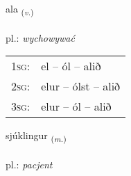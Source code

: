\documentclass[frontgrid, backgrid]{flacards}\usepackage[]{graphicx}\usepackage[]{xcolor}
\begin{document}
\renewcommand{\flhead}{\vskip5pt \fboxsep=0pt {\small\bfseries\footnotesize Sagnorð | Verb}}
\renewcommand{\fcfoot}{\vskip5pt \fboxsep=0pt \hspace{2pt}{\small\bfseries\footnotesize 1K}}

\renewcommand{\blhead}{\vskip5pt {\small\bfseries\footnotesize Sagnorð | Verb }}
\renewcommand{\bcfoot}{\vskip5pt \hspace{2pt}{\small\bfseries\footnotesize 1K}}


{ala \small{\textsubscript{(\textit{v.})}} \\[1ex] %
\textphonetic{[aːla]} \\
pl.: \emph{wychowywać} \\  [2ex]
\renewcommand*{\arraystretch}{0.8}
\begin{tabular}{p{1cm}l}
\textsc{1sg}: & el -- ól -- alið \\ 
\textsc{2sg}: & elur -- ólst -- alið \\ 
\textsc{3sg}: & elur -- ól -- alið \\ 
\end{tabular}
}

\renewcommand{\flhead}{\vskip5pt \fboxsep=0pt {\small\bfseries\footnotesize Nafnorð | Noun}}
\renewcommand{\fcfoot}{\vskip5pt \fboxsep=0pt \hspace{2pt}{\small\bfseries\footnotesize 1K}}

\renewcommand{\blhead}{\vskip5pt {\small\bfseries\footnotesize Nafnorð | Noun }}
\renewcommand{\bcfoot}{\vskip5pt \hspace{2pt}{\small\bfseries\footnotesize 1K}}


{sjúklingur \small{\textsubscript{(\textit{m.})}} \\[1ex] %
\textphonetic{[sjuhkliŋkʏr]} \\
pl.: \emph{pacjent} \\  [2ex]
\renewcommand*{\arraystretch}{0.8}
}
\end{document}

